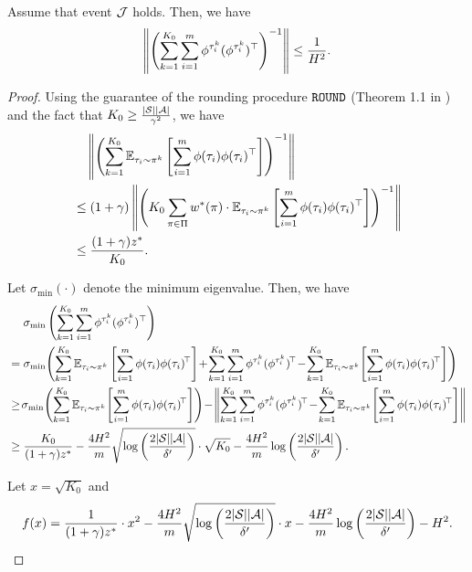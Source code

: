 \begin{lemma} \label{lemma:seg_e_optimal_design}
	Assume that event $\mathcal{J}$ holds. Then, we have
	\begin{align*}
		\left\|  \left( \sum_{k=1}^{K_0} \sum_{i=1}^{m} \phi^{\tau^k_i} (\phi^{\tau^k_i})^\top \right)^{-1}  \right\| \leq \frac{1}{H^2} .
	\end{align*}
\end{lemma}
\begin{proof}
	Using the guarantee of the rounding procedure $\mathtt{ROUND}$ (Theorem 1.1 in \cite{allen2021near}) and the fact that $K_0 \geq \frac{|\mathcal{S}| |\mathcal{A}|}{\gamma^2}$, we have
	\begin{align*}
		&\quad \left\|  \left( \sum_{k=1}^{K_0}  \mathbb{E}_{\tau_i \sim \pi^k}\left[ \sum_{i=1}^{m} \phi(\tau_i) \phi(\tau_i)^\top \right]  \right)^{-1}  \right\|
		\\
		&\leq (1+\gamma) \left\|   \left(  K_0 \sum_{\pi \in \Pi} w^*(\pi) \cdot  \mathbb{E}_{\tau_i \sim \pi^k}\left[ \sum_{i=1}^{m} \phi(\tau_i) \phi(\tau_i)^\top \right]  \right)^{-1}  \right\|
		\\
		&\leq \frac{(1+\gamma) z^*}{K_0} .
	\end{align*}
	
	
	Let $\sigma_{\min}(\cdot)$ denote the minimum eigenvalue.
	Then, we have
	\begin{align}
		&\quad\ \sigma_{\min}\sbr{ \sum_{k=1}^{K_0} \sum_{i=1}^{m} \phi^{\tau^k_i} (\phi^{\tau^k_i})^\top }
		\nonumber\\
		&= \sigma_{\min}\!\sbr{ \sum_{k=1}^{K_0} \ex_{\tau_i \sim \pi^k}\mbr{\sum_{i=1}^{m} \phi(\tau_i) \phi(\tau_i)^{\!\top}} \!+\! \sum_{k=1}^{K_0} \sum_{i=1}^{m} \phi^{\tau^k_i} (\phi^{\tau^k_i})^{\!\top} \!-\! \sum_{k=1}^{K_0} \ex_{\tau_i \sim \pi^k}\!\mbr{\sum_{i=1}^{m} \phi(\tau_i) \phi(\tau_i)^{\!\top}} }
		\nonumber\\
		&\geq \!\sigma_{\min}\!\sbr{ \sum_{k=1}^{K_0} \ex_{\tau_i \sim \pi^k}\!\mbr{\sum_{i=1}^{m} \phi(\tau_i) \phi(\tau_i)^{\!\top}} } \!-\! \nbr{ \sum_{k=1}^{K_0} \sum_{i=1}^{m} \phi^{\tau^k_i} (\phi^{\tau^k_i})^{\!\top} \!-\! \sum_{k=1}^{K_0} \ex_{\tau_i \sim \pi^k}\!\mbr{\sum_{i=1}^{m} \phi(\tau_i) \phi(\tau_i)^{\!\top}} }
		\nonumber\\
		&\geq \frac{ K_0 }{(1+\gamma) z^*} - \frac{4H^2}{m}\sqrt{\log\sbr{\frac{2|\cS||\cA|}{\delta'}}} \cdot \sqrt{K_0} - \frac{4H^2}{m} \log\sbr{\frac{2|\cS||\cA|}{\delta'}} . \label{eq:seg_minimum_eig_derivation}
	\end{align}
	
	
	Let $x=\sqrt{K_0}$ and
	\begin{align*}
		f(x) = \frac{ 1 }{(1+\gamma) z^*} \cdot x^2 - \frac{4H^2}{m} \sqrt{\log\left( \frac{2|\mathcal{S}||\mathcal{A}|}{\delta'} \right)} \cdot x - \frac{4H^2}{m} \log\left( \frac{2|\mathcal{S}||\mathcal{A}|}{\delta'} \right) - H^2 .
	\end{align*}
	

\end{proof}
